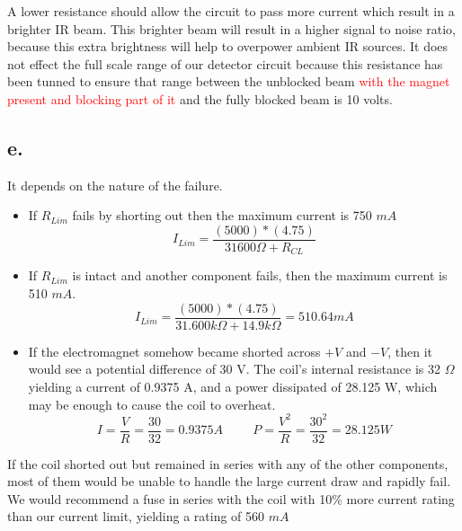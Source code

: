 \documentclass{article}
\newcommand{\xxx}[1]{\textcolor{red}{#1}}
\theoremstyle{plain}
\theoremstyle{definition}
\theoremstyle{remark}
\begin{document}
A lower resistance should allow the circuit to pass more current which result in a brighter IR beam. This brighter beam will result in a higher signal to noise ratio, because this extra brightness will help to overpower ambient IR sources. It does not effect the full scale range of our detector circuit because this resistance has been tunned to ensure that range between the unblocked beam \xxx{with the magnet present and blocking part of it} and the fully blocked beam is 10 volts. \\  

\subsection*{e.}
It depends on the nature of the failure. 

\begin{itemize}
\item If $R_{Lim}$ fails by shorting out then the maximum current is 750 $mA$ \\

$$I_{Lim} = \frac{(5000)*(4.75)}{31600\Omega + R_{CL}} $$

\item If $R_{Lim}$ is intact and another component fails, then the maximum current is 510 $mA$. \\

$$I_{Lim} = \frac{(5000)*(4.75)}{31.600k\Omega + 14.9k\Omega} =510.64mA$$

\item If the electromagnet somehow became shorted across $+V$ and $-V$, then it would see a potential difference of 30 V.  The coil's internal resistance is 32 $\Omega$ yielding a current of 0.9375 A, and a power dissipated of 28.125 W, which may be enough to cause the coil to overheat.\\


$$I = \frac{V}{R} = \frac{30}{32} = 0.9375 A \hspace{1cm}  P = \frac{V^{2}}{R} = \frac{30^2}{32} = 28.125 W $$
\end{itemize}

If the coil shorted out but remained in series with any of the other components, most of them would be unable to handle the large current draw and rapidly fail.  We would recommend a fuse in series with the coil with 10\% more current rating than our current limit, yielding a rating of 560 $mA$\\
\end{document}
